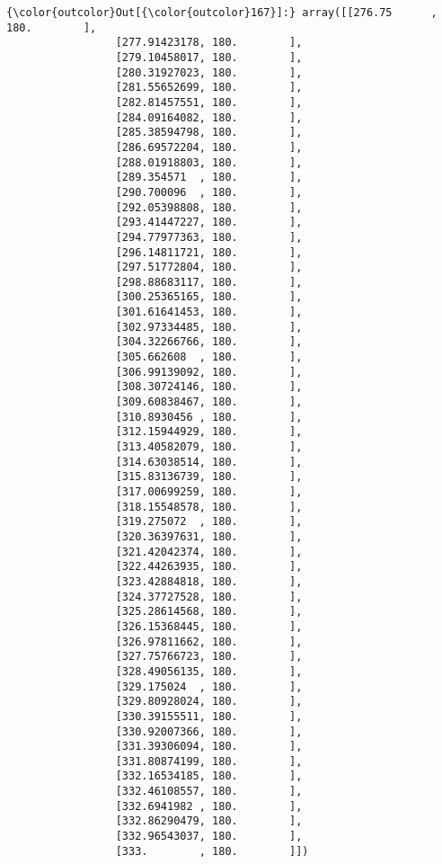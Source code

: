 \documentclass[11pt]{article}
\begin{document}
\begin{Verbatim}[commandchars=\\\{\}]
{\color{outcolor}Out[{\color{outcolor}167}]:} array([[276.75      , 180.        ],
                 [277.91423178, 180.        ],
                 [279.10458017, 180.        ],
                 [280.31927023, 180.        ],
                 [281.55652699, 180.        ],
                 [282.81457551, 180.        ],
                 [284.09164082, 180.        ],
                 [285.38594798, 180.        ],
                 [286.69572204, 180.        ],
                 [288.01918803, 180.        ],
                 [289.354571  , 180.        ],
                 [290.700096  , 180.        ],
                 [292.05398808, 180.        ],
                 [293.41447227, 180.        ],
                 [294.77977363, 180.        ],
                 [296.14811721, 180.        ],
                 [297.51772804, 180.        ],
                 [298.88683117, 180.        ],
                 [300.25365165, 180.        ],
                 [301.61641453, 180.        ],
                 [302.97334485, 180.        ],
                 [304.32266766, 180.        ],
                 [305.662608  , 180.        ],
                 [306.99139092, 180.        ],
                 [308.30724146, 180.        ],
                 [309.60838467, 180.        ],
                 [310.8930456 , 180.        ],
                 [312.15944929, 180.        ],
                 [313.40582079, 180.        ],
                 [314.63038514, 180.        ],
                 [315.83136739, 180.        ],
                 [317.00699259, 180.        ],
                 [318.15548578, 180.        ],
                 [319.275072  , 180.        ],
                 [320.36397631, 180.        ],
                 [321.42042374, 180.        ],
                 [322.44263935, 180.        ],
                 [323.42884818, 180.        ],
                 [324.37727528, 180.        ],
                 [325.28614568, 180.        ],
                 [326.15368445, 180.        ],
                 [326.97811662, 180.        ],
                 [327.75766723, 180.        ],
                 [328.49056135, 180.        ],
                 [329.175024  , 180.        ],
                 [329.80928024, 180.        ],
                 [330.39155511, 180.        ],
                 [330.92007366, 180.        ],
                 [331.39306094, 180.        ],
                 [331.80874199, 180.        ],
                 [332.16534185, 180.        ],
                 [332.46108557, 180.        ],
                 [332.6941982 , 180.        ],
                 [332.86290479, 180.        ],
                 [332.96543037, 180.        ],
                 [333.        , 180.        ]])
\end{Verbatim}
            
\end{document}
